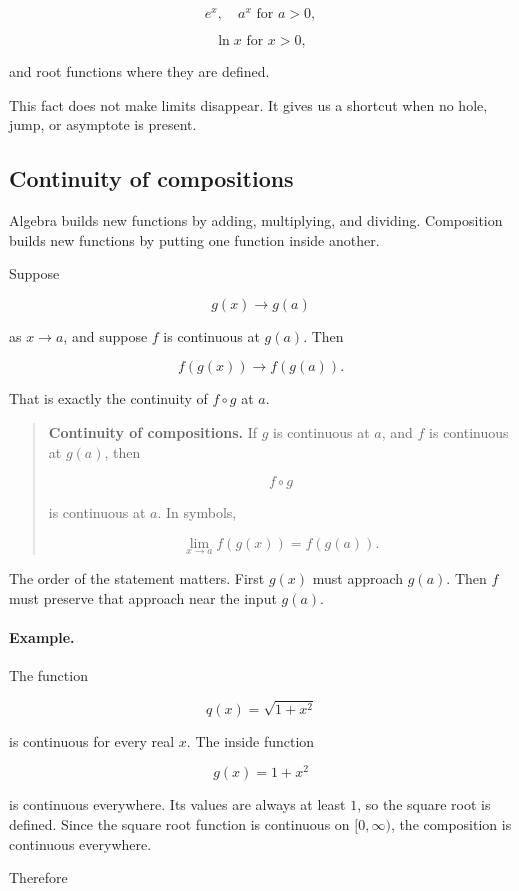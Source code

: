 \[
e^x,\quad a^x\text{ for }a>0,
\]

\[
\ln x\text{ for }x>0,
\]

and root functions where they are defined.

This fact does not make limits disappear.  It gives us a shortcut when no hole, jump, or asymptote is present.

\subsection{Continuity of compositions}
\label{subsec:continuity-compositions}

Algebra builds new functions by adding, multiplying, and dividing.  Composition builds new functions by putting one function inside another.

Suppose

\[
g(x)\to g(a)
\]

as \(x\to a\), and suppose \(f\) is continuous at \(g(a)\).  Then

\[
f(g(x))\to f(g(a)).
\]

That is exactly the continuity of \(f\circ g\) at \(a\).

\begin{quote}
\textbf{Continuity of compositions.}
If \(g\) is continuous at \(a\), and \(f\) is continuous at \(g(a)\), then

\[
f\circ g
\]

is continuous at \(a\).  In symbols,

\[
\lim_{x\to a}f(g(x))=f(g(a)).
\]
\end{quote}

The order of the statement matters.  First \(g(x)\) must approach \(g(a)\).  Then \(f\) must preserve that approach near the input \(g(a)\).

\paragraph{Example.}
The function

\[
q(x)=\sqrt{1+x^2}
\]

is continuous for every real \(x\).  The inside function

\[
g(x)=1+x^2
\]

is continuous everywhere.  Its values are always at least \(1\), so the square root is defined.  Since the square root function is continuous on \([0,\infty)\), the composition is continuous everywhere.

Therefore

